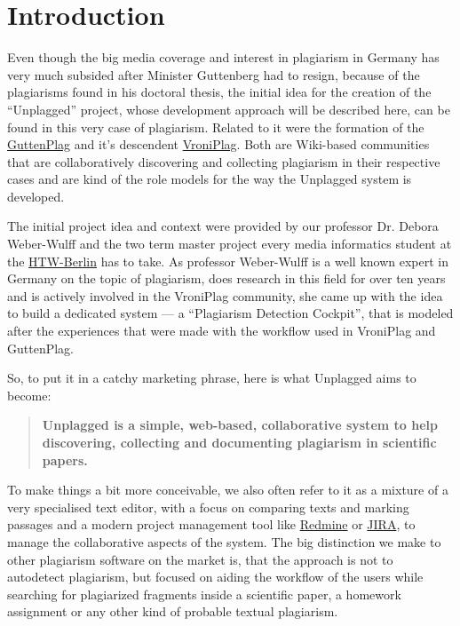 \chapter{Introduction}

Even though the big media coverage and interest in plagiarism in Germany has very much subsided 
after Minister Guttenberg had to resign, because of the plagiarisms found in his doctoral thesis\citep{Google2012}, 
the initial idea for the 
creation of the \enquote{Unplagged} project, whose development approach will be described here, can be found in this 
very case of plagiarism. Related to it were the formation of the
\href{http://de.guttenplag.wikia.com/wiki/GuttenPlag\_Wiki}{GuttenPlag} and it's descendent 
\href{http://de.vroniplag.wikia.com/wiki/Home}{VroniPlag}. Both are Wiki-based communities that are collaboratively 
discovering and collecting plagiarism in their respective cases and are kind of the role models for the way the
Unplagged system is developed.

The initial project idea and context were provided by our professor Dr. Debora Weber-Wulff and the two term master project
every media informatics student at the \href{http://htw-berlin.de/}{HTW-Berlin} has to take. As professor Weber-Wulff is 
a well known expert in Germany on the
topic of plagiarism,
does research in this field for over ten years\citep{Spiegel-Online2011} and is actively involved in the VroniPlag
community, she came up with the idea to build a dedicated system --- a \enquote{Plagiarism Detection Cockpit}\citep{Weber-Wulff2011}, 
that is modeled after the experiences that were made
with the workflow used in VroniPlag and GuttenPlag.

So, to put it in a catchy marketing phrase, here is what Unplagged aims to become: 

\begin{quote}
\textbf{Unplagged is a simple, web-based, collaborative system to help discovering, collecting and 
documenting plagiarism in scientific papers.}
\end{quote}

To make things a bit more conceivable, we also often refer to it as a mixture of a very specialised text editor, with a focus on 
comparing texts and marking 
passages and a modern project management tool like \href{http://www.redmine.org/}{Redmine} or 
\href{http://www.atlassian.com/JIRA}{JIRA}, 
to manage the collaborative aspects of the system. The big distinction we make to other plagiarism software on the market is, 
that the approach is not to autodetect plagiarism, but focused on aiding the workflow of the users while  
searching for plagiarized
fragments inside a scientific paper, a homework assignment or any other kind of probable textual plagiarism.

